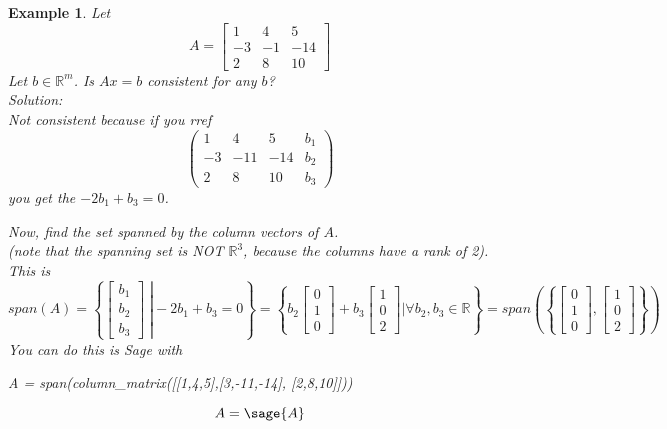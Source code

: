 \documentclass[11pt]{article}
\newtheorem{ex}{Example}
\begin{document}
\begin{ex}
  Let
  \[A =\begin{bmatrix} 1 & 4 & 5 \\ -3 & -1 & -14 \\ 2 & 8 & 10 \end{bmatrix}\]
  Let $b \in \mathbb{R}^{m}$. Is $Ax=b$ consistent for any $b$? \\
  Solution: \\
  Not consistent because if you rref
  \[
\left(\begin{array}{rrrr}
1 & 4 & 5 & b_{1} \\
-3 & -11 & -14 & b_{2} \\
2 & 8 & 10 & b_{3}
\end{array}\right) \]
you get the $-2b_{1} + b_{3} = 0$.

Now, find the set spanned by the column vectors of $A$. \\

(note that the spanning set is NOT $\mathbb{R}^{3}$, because the columns have a
rank of 2).
This is
\[span(A) = \left \{\left . \begin{bmatrix} b_{1} \\ b_{2} \\ b_{3} \end{bmatrix} \; \right\vert -2b_{1} + b_{3} = 0\right\} = \left\{ b_{2} \begin{bmatrix} 0 \\ 1 \\ 0 \end{bmatrix} + b_{3} \begin{bmatrix} 1 \\ 0 \\ 2 \end{bmatrix} \vert \forall b_{2}, b_{3} \in \mathbb{R}\right\} = span\left(\left\{\begin{bmatrix} 0 \\ 1 \\ 0 \end{bmatrix}, \begin{bmatrix} 1 \\ 0 \\2\end{bmatrix}\right\}\right)\]
You can do this is Sage with
\begin{sageblock}
 A =  span(column_matrix([[1,4,5],[3,-11,-14], [2,8,10]]))
\end{sageblock}
\end{ex}
\[A = \sage{A}\]
\end{document}
